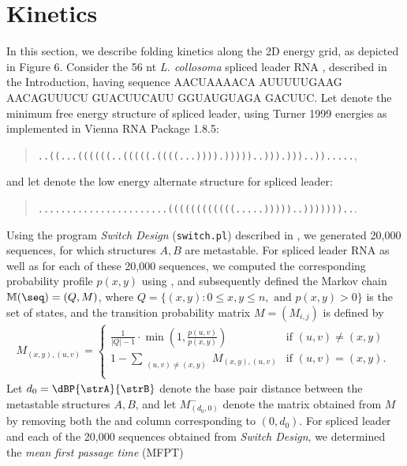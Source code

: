 \section{Kinetics}
\label{section:kinetics}

In this section, we describe folding kinetics along the 2D energy
grid, as depicted in
Figure 6.
Consider the
56 nt {\em L. collosoma} spliced leader RNA \cite{lecuyerCrothers},
described in the Introduction, having
sequence AACUAAAACA AUUUUUGAAG AACAGUUUCU GUACUUCAUU GGUAUGUAGA
GACUUC.
Let \strA denote the minimum free energy structure of spliced leader,
using Turner 1999 energies as implemented in Vienna RNA Package 1.8.5:
\begin{quote}
{\tt ..((...((((((..(((((.((((...)))).)))))..))).)))..)).....},
\end{quote}
and let \strB denote the low energy alternate structure for spliced leader:
\begin{quote}
{\tt .......................((((((((((((.....)))))..)))))))..}.
\end{quote}
Using the program {\em Switch Design} ({\tt switch.pl}) described in
\cite{Flamm.r01}, we generated 20,000 sequences, for which structures
$A,B$ are metastable. For spliced leader RNA as well as for each of
these 20,000 sequences, we computed the corresponding
probability profile $p(x,y)$ using \ffttwo,
and subsequently defined the Markov chain ${\mathbb{M}}(\seq) = (Q,M)$, where
$Q = \{ (x,y) : 0 \leq x,y \leq n, \mbox{ and } p(x,y)>0 \}$
is the set of states, and the
transition probability matrix $M = (M_{i,j})$ is defined by
\begin{eqnarray*}
M_{(x,y), (u,v)} = \left\{ \begin{array}{ll}
\frac{1}{|Q|-1} \cdot \min(1, \frac{p(u,v)}{p(x,y)})
&\mbox{if $(u,v) \ne (x,y)$}\\
1 - \displaystyle\sum_{\substack{(u,v) \ne (x,y)}} M_{(x,y),(u,v)}
&\mbox{if $(u,v) = (x,y)$. }\\
\end{array} \right.
\end{eqnarray*}
Let $d_0=\dBP{\strA}{\strB}$ denote the base pair distance between the metastable
structures $A,B$, and let $M^{-}_{(d_0,0)}$ denote the matrix obtained from
$M$ by removing both the and column corresponding to $(0,d_0)$.
For spliced leader and each of the 20,000 sequences obtained from
{\em Switch Design}, we determined the {\em mean first passage time} (MFPT)
